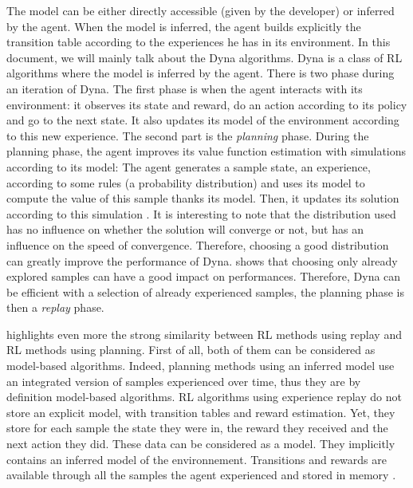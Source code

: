 \documentclass[]{article}
\begin{document}
The model can be either directly accessible (given by the developer) or inferred by the agent. When the model is inferred, the agent builds explicitly the transition table according to the experiences he has in its environment. In this document, we will mainly talk about the Dyna algorithms. Dyna is a class of RL algorithms where the model is inferred by the agent. There is two phase during an iteration of Dyna. The first phase is when the agent interacts with its environment: it observes its state and reward, do an action according to its policy and go to the next state. It also updates its model of the environment according to this new experience. The second part is the \emph{planning} phase. During the planning phase, the agent improves its value function estimation with simulations according to its model: The agent generates a sample state, an experience, according to some rules (a probability distribution) and uses its model to compute the value of this sample thanks its model. Then, it updates its solution according to this simulation \parencite{sutton_dyna-style_2012}.
It is interesting to note that the distribution used has no influence on whether the solution will converge or not, but has an influence on the speed of convergence. Therefore, choosing a good distribution can greatly improve the performance of Dyna. \textcite{sutton_dyna-style_2012} shows that choosing only already explored samples can have a good impact on performances. Therefore, Dyna can be efficient with a selection of already experienced samples, the planning phase is then a \emph{replay} phase.

\textcite{vanseijen_deeper_2015} highlights even more the strong similarity between RL methods using replay and RL methods using planning. First of all, both of them can be considered as model-based algorithms. Indeed, planning methods using an inferred model use an integrated version of samples experienced over time, thus they are by definition model-based algorithms.
RL algorithms using experience replay do not store an explicit model, with transition tables and reward estimation. Yet, they store for each sample the state they were in, the reward they received and the next action they did. These data can be considered as a model. They implicitly contains an inferred model of the environnement. Transitions and rewards are available through all the samples the agent experienced and stored in memory \parencite{vanseijen_deeper_2015}.
\end{document}
